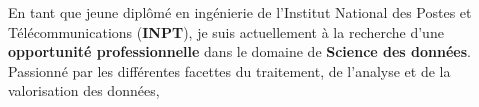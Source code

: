 

\begin{cvparagraph}

\begin{itemize}
\renewcommand{\labelitemi}{}
\itemEn En tant que jeune diplômé en ingénierie de l'Institut National des Postes et Télécommunications (\textbf{INPT}), je suis actuellement à la recherche d'une \textbf{opportunité professionnelle} dans le domaine de \textbf{Science des données}. Passionné par les différentes facettes du traitement, de l’analyse et de la valorisation des données, 

\end{itemize}
\end{cvparagraph}